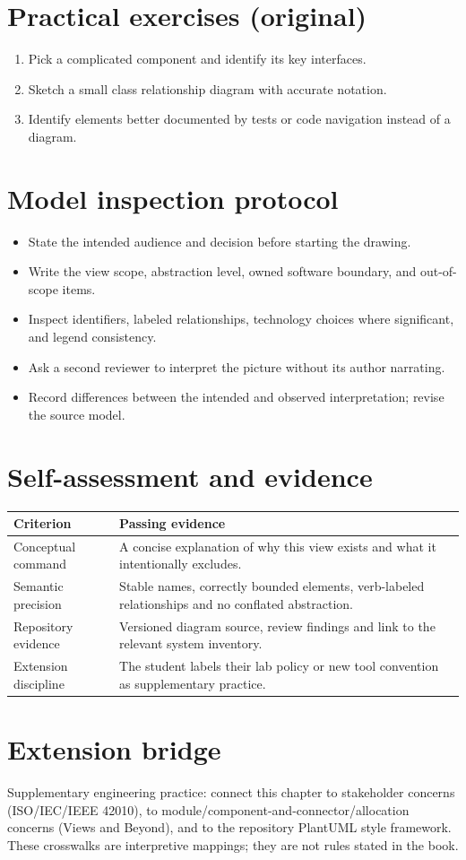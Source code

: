 \documentclass[10pt,letterpaper]{article}
\begin{document}
\section{Practical exercises (original)}
\begin{enumerate}
\item Pick a complicated component and identify its key interfaces.
\item Sketch a small class relationship diagram with accurate notation.
\item Identify elements better documented by tests or code navigation instead of a diagram.
\end{enumerate}

\section{Model inspection protocol}
\begin{itemize}
\item State the intended audience and decision before starting the drawing.
\item Write the view scope, abstraction level, owned software boundary, and out-of-scope items.
\item Inspect identifiers, labeled relationships, technology choices where significant, and legend consistency.
\item Ask a second reviewer to interpret the picture without its author narrating.
\item Record differences between the intended and observed interpretation; revise the source model.
\end{itemize}

\section{Self-assessment and evidence}
\begin{tabularx}{\linewidth}{@{}YY@{}}\toprule
\textbf{Criterion} & \textbf{Passing evidence} \\ \midrule
Conceptual command & A concise explanation of why this view exists and what it intentionally excludes. \\
Semantic precision & Stable names, correctly bounded elements, verb-labeled relationships and no conflated abstraction. \\
Repository evidence & Versioned diagram source, review findings and link to the relevant system inventory. \\
Extension discipline & The student labels their lab policy or new tool convention as supplementary practice. \\
\bottomrule\end{tabularx}


\section{Extension bridge}
Supplementary engineering practice: connect this chapter to stakeholder concerns (ISO/IEC/IEEE 42010), to module/component-and-connector/allocation concerns (Views and Beyond), and to the repository PlantUML style framework. These crosswalks are interpretive mappings; they are not rules stated in the book.
\end{document}
